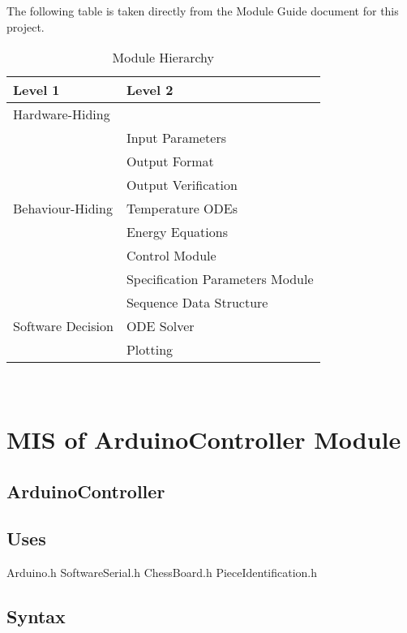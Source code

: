 \documentclass[12pt, titlepage]{article}
\begin{document}
The following table is taken directly from the Module Guide document for this project.

\begin{table}[h!]
\centering
\begin{tabular}{p{} p{}}
\toprule
\textbf{Level 1} & \textbf{Level 2}\\
\midrule

{Hardware-Hiding} & ~ \\
\midrule

\multirow{7}{0.3\textwidth}{Behaviour-Hiding} & Input Parameters\\
& Output Format\\
& Output Verification\\
& Temperature ODEs\\
& Energy Equations\\ 
& Control Module\\
& Specification Parameters Module\\
\midrule

\multirow{3}{0.3\textwidth}{Software Decision} & {Sequence Data Structure}\\
& ODE Solver\\
& Plotting\\
\bottomrule

\end{tabular}
\caption{Module Hierarchy}
\label{TblMH}
\end{table}

\newpage
~\newpage


\section{MIS of ArduinoController Module} \label{ArduinoControllerModule}



\subsection{ArduinoController}

\subsection{Uses}
Arduino.h
SoftwareSerial.h
ChessBoard.h
PieceIdentification.h

\subsection{Syntax}
\end{document}
